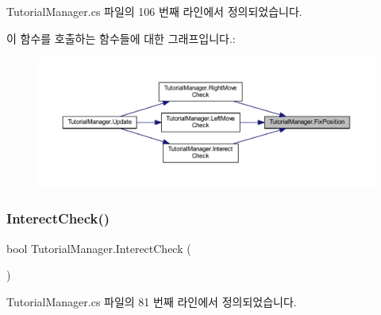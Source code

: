 Tutorial\+Manager.\+cs 파일의 106 번째 라인에서 정의되었습니다.


\begin{DoxyCode}{0}

\end{DoxyCode}
이 함수를 호출하는 함수들에 대한 그래프입니다.\+:\nopagebreak
\begin{figure}[H]
\begin{center}
\leavevmode
\includegraphics[width=350pt]{d6/d14/class_tutorial_manager_a09cf95368e659b0c1833572420b51257_icgraph}
\end{center}
\end{figure}
\mbox{\label{class_tutorial_manager_a2e63bc12fb25813fa5b32f82b4eeed6a}} 
\subsubsection{\texorpdfstring{InterectCheck()}{InterectCheck()}}
{\footnotesize\ttfamily bool Tutorial\+Manager.\+Interect\+Check (\begin{DoxyParamCaption}{ }\end{DoxyParamCaption})\hspace{0.3cm}{\ttfamily [private]}}



Tutorial\+Manager.\+cs 파일의 81 번째 라인에서 정의되었습니다.


